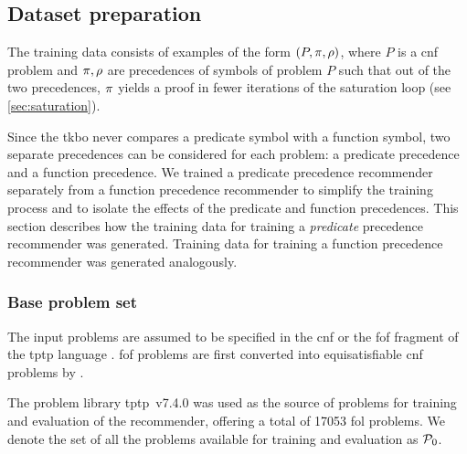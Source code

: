 \subsection{Dataset preparation}

The training data consists of examples of the form $(P, \pi, \rho)$,
where $P$ is a \gls{cnf} problem and $\pi, \rho$ are precedences of symbols of problem $P$
such that out of the two precedences, $\pi$ yields a proof in fewer iterations of the saturation loop (see \cref{sec:saturation}).

Since the \gls{tkbo} never compares a predicate symbol with a function symbol,
two separate precedences can be considered for each problem:
a predicate precedence and a function precedence.
We trained a predicate precedence recommender separately from a function precedence recommender
to simplify the training process and to isolate the effects of the predicate and function precedences.
This section describes how the training data for training a \emph{predicate} precedence recommender was generated.
Training data for training a function precedence recommender was generated analogously.

\subsubsection{Base problem set}

The input problems are assumed to be specified in the \gls{cnf} or the \gls{fof} fragment
of the \acrshort{tptp} language \cite{Sutcliffe2017}.
\Gls{fof} problems are first converted into equisatisfiable \gls{cnf} problems by \Vampire{}.

The problem library \acrshort{tptp}~v7.4.0 \cite{10.1007/978-3-030-29436-6_29}
was used as the source of problems for training and evaluation of the recommender,
offering a total of \num{17053} \gls{fol} problems.
We denote the set of all the problems available for training and evaluation as $\operatorname{\mathcal{P}_{0}}$.

